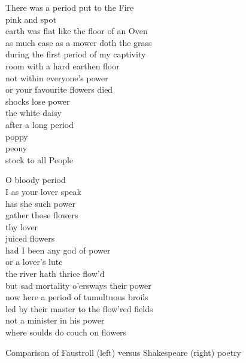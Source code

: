 \begin{figure}[h!]
\centering
\begin{minipage}{.45\linewidth}
  {\footnotesize\sffamily\SingleSpacing
  There was a period put to the Fire\\
  pink and spot\\
  earth was flat like the floor of an Oven\\
  as much ease as a mower doth the grass\\

  during the first period of my captivity\\
  room with a hard earthen floor\\
  not within everyone's power\\
  or your favourite flowers died\\

  shocks lose power\\
  the white daisy\\
  after a long period\\

  poppy\\
  peony\\
  stock to all People\\}
\end{minipage}
\hspace{.02\linewidth}
\begin{minipage}{.45\linewidth}
  {\footnotesize\sffamily\SingleSpacing
  O bloody period\\
  I as your lover speak\\
  has she such power\\
  gather those flowers\\

  thy lover\\
  juiced flowers\\
  had I been any god of power\\
  or a lover's lute\\

  the river hath thrice flow'd\\
  but sad mortality o'ersways their power\\
 	now here a period of tumultuous broils\\

  led by their master to the flow'red fields\\
  not a minister in his power\\
  where soulds do couch on flowers\\}
\end{minipage}
\caption[Faustroll vs Shakespeare]{Comparison of Faustroll (left) versus Shakespeare (right) poetry}
\label{fig:2poems}
\end{figure}

